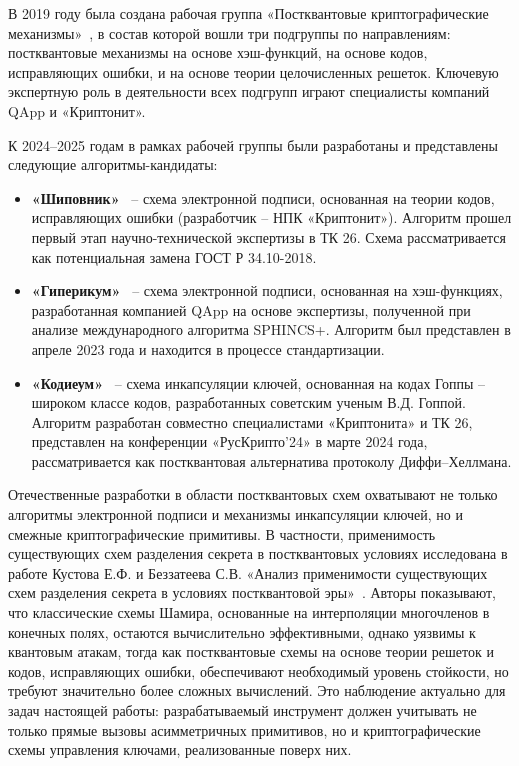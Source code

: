 \documentclass{itmo-vkr}
\begin{document}
	В 2019 году была создана рабочая группа «Постквантовые криптографические механизмы»~\cite{tc26-postquantum}, в состав которой вошли три подгруппы по направлениям: постквантовые механизмы на основе хэш-функций, на основе кодов, исправляющих ошибки, и на основе теории целочисленных решеток. Ключевую экспертную роль в деятельности всех подгрупп играют специалисты компаний QApp и «Криптонит».
	
	К 2024–2025 годам в рамках рабочей группы были разработаны и представлены следующие алгоритмы-кандидаты:
	
	\begin{itemize}
		\item \textbf{«Шиповник»}~\cite{kryptonite-shipovnik} -- схема электронной подписи, основанная на теории кодов, исправляющих ошибки (разработчик -- НПК «Криптонит»). Алгоритм прошел первый этап научно-технической экспертизы в ТК 26. Схема рассматривается как потенциальная замена ГОСТ Р 34.10-2018.
		
		\item \textbf{«Гиперикум»}~\cite{qapp-hypericum} -- схема электронной подписи, основанная на хэш-функциях, разработанная компанией QApp на основе экспертизы, полученной при анализе международного алгоритма SPHINCS+. Алгоритм был представлен в апреле 2023 года и находится в процессе стандартизации.
		
		\item \textbf{«Кодиеум»}~\cite{kryptonite-codiaeum} -- схема инкапсуляции ключей, основанная на кодах Гоппы -- широком классе кодов, разработанных советским ученым В.Д. Гоппой. Алгоритм разработан совместно специалистами «Криптонита» и ТК 26, представлен на конференции «РусКрипто'24» в марте 2024 года, рассматривается как постквантовая альтернатива протоколу Диффи–Хеллмана.
	\end{itemize}
	
	Отечественные разработки в области постквантовых схем охватывают не только алгоритмы электронной подписи и механизмы инкапсуляции ключей, но и смежные криптографические примитивы. В частности, применимость существующих схем разделения секрета в постквантовых условиях исследована в работе Кустова Е.Ф. и Беззатеева С.В. «Анализ применимости существующих схем разделения секрета в условиях постквантовой эры»~\cite{razdelenie-sekreta-postkvantovoe}. Авторы показывают, что классические схемы Шамира, основанные на интерполяции многочленов в конечных полях, остаются вычислительно эффективными, однако уязвимы к квантовым атакам, тогда как постквантовые схемы на основе теории решеток и кодов, исправляющих ошибки, обеспечивают необходимый уровень стойкости, но требуют значительно более сложных вычислений. Это наблюдение актуально для задач настоящей работы: разрабатываемый инструмент должен учитывать не только прямые вызовы асимметричных примитивов, но и криптографические схемы управления ключами, реализованные поверх них.
	
\end{document}
